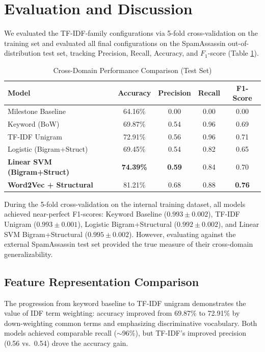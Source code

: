 \documentclass[sigconf]{acmart}
\begin{document}
\section{Evaluation and Discussion}
We evaluated the TF-IDF-family configurations via 5-fold cross-validation on the training set and evaluated all final configurations on the SpamAssassin out-of-distribution test set, tracking Precision, Recall, Accuracy, and \(F_1\)-score (Table \ref{tab:results}).

\begin{table}[h]
\centering
\caption{Cross-Domain Performance Comparison (Test Set)}
\label{tab:results}
\begin{tabular}{@{}lcccc@{}}
\toprule
Model & Accuracy & Precision & Recall & F1-Score \\ \midrule
Milestone Baseline & 64.16\% & 0.00 & 0.00 & 0.00 \\
Keyword (BoW) & 69.87\% & 0.54 & 0.96 & 0.69 \\
TF-IDF Unigram & 72.91\% & 0.56 & 0.96 & 0.71 \\
Logistic (Bigram+Struct) & 69.45\% & 0.54 & 0.82 & 0.65 \\
\textbf{Linear SVM (Bigram+Struct)} & \textbf{74.39\%} & \textbf{0.59} & 0.84 & 0.70 \\
\textbf{Word2Vec + Structural} & 81.21\% & 0.68 & 0.88 & \textbf{0.76} \\ \bottomrule
\end{tabular}
\end{table}

During the 5-fold cross-validation on the internal training dataset, all models achieved near-perfect F1-scores: Keyword Baseline (\(0.993 \pm 0.002\)), TF-IDF Unigram (\(0.993 \pm 0.001\)), Logistic Bigram+Structural (\(0.992 \pm 0.002\)), and Linear SVM Bigram+Structural (\(0.995 \pm 0.002\)). However, evaluating against the external SpamAssassin test set provided the true measure of their cross-domain generalizability.

\subsection{Feature Representation Comparison}
The progression from keyword baseline to TF-IDF unigram demonstrates the value of IDF term weighting: accuracy improved from 69.87\% to 72.91\% by down-weighting common terms and emphasizing discriminative vocabulary. Both models achieved comparable recall ($\sim$96\%), but TF-IDF's improved precision (0.56 vs.\ 0.54) drove the accuracy gain.
\end{document}
